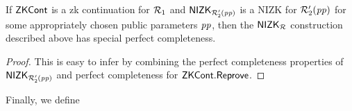 \begin{lemma} 
\label{le:specialCompl_for_nizkR}
If ${\mathsf{ZKCont}}$ is a zk continuation for $\mathcal{R}_1$ and ${\mathsf{NIZK_{\mathcal{R}'_2(\mathit{pp})}}}$ is a NIZK for $\mathcal{R}_2'(\mathit{pp})$ for some appropriately chosen public parameters $\mathit{pp}$, 
then the ${\mathsf{NIZK_{\mathcal{R}}}}$ construction described above has special perfect completeness.
\end{lemma} 
\begin{proof} This is easy to infer by combining the perfect completeness properties of ${\mathsf{NIZK_{\mathcal{R}'_2(\mathit{pp})}}}$ and perfect completeness 
for ${\mathsf{ZKCont}}.{\mathsf{Reprove}}$.

\end{proof}

\noindent Finally, we define \\
\begin{comment} 
\noindent \textbf{Perfect Zero-knowledge after Reproving a $\ZKCont$ Proof} For all $\lambda \in \mathbb{N}$, 
for every benign auxiliary input $aux$, 
for all $\bary,\barx,\barz, \baromega_1, \baromega_2$ with $(\bary, \barx; \baromega_1) \in \relone$ and 
$(\barz, \barx; \baromega_2) \in \reltwo$, for all $X,\pi_1,\pi_2, b$, for every adversary $A$ it holds:
\begin{align*}
\mathit{Pr}(& A(\crs, \realaux, \pi'_1,\pi_2, X', \rel) = 1 \ | \\
                  & \ (\crs, \tw, \pp) \leftarrow \ZKCont.\Setup (1^{\lambda}, \relone), \\
                  & (\pi'_1, X', \_) \leftarrow \ZKCont.\Reprove (\crs, X, \pi, b, \relone), \\
                  & \pi_2 \leftarrow \nizktwo.\Prove(\crstwo, X, \barz, \barx, b, \baromega_2), \\
                  &  \ZKCont.\Verify(\crs, \bary, X, \pi, \relone) = 1 
                  \wedge \VerifyCom(\pp, X, \bar{x}, b) = 1) =  \\
= \mathit{Pr}(& A(\crs, \realaux, \pi',\pi_2, X', \rel) = 1 \ | \\ 
                     & \ (\crs, \tw, \pp) \leftarrow \ZKCont.\Setup (1^{\lambda}, \relone), \\ 
                     & (\pi'_1, X',\pi_2) \leftarrow \nizkR.\Sim(\tw, \bary, \relone) \\ 
                     &  \ZKCont.\Verify(\crs, \bary, X, \pi, \relone) = 1
                    \wedge \VerifyCom(\pp, X, \bar{x}, b) = 1)
\end{align*}
\end{comment} 

